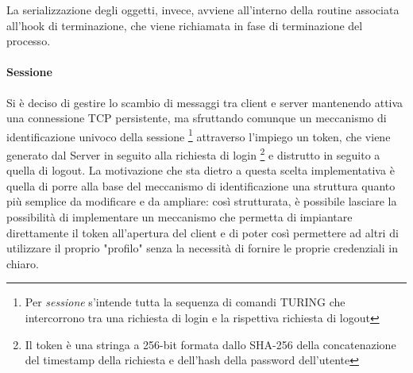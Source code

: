 La serializzazione degli oggetti, invece, avviene all'interno della routine associata all'hook di terminazione, che viene richiamata in fase di terminazione del processo.

\paragraph{Sessione}
Si è deciso di gestire lo scambio di messaggi tra client e server mantenendo attiva una connessione TCP persistente, ma sfruttando comunque un meccanismo di identificazione univoco della sessione \footnote{Per \textit{sessione} s'intende tutta la sequenza di comandi TURING che intercorrono tra una richiesta di login e la rispettiva richiesta di logout} attraverso l'impiego un token, che viene generato dal Server in seguito alla richiesta di login \footnote{Il token è una stringa a 256-bit formata dallo SHA-256 della concatenazione del timestamp della richiesta e dell'hash della password dell'utente} e distrutto in seguito a quella di logout. La motivazione che sta dietro a questa scelta implementativa è quella di porre alla base del meccanismo di identificazione una struttura quanto più semplice da modificare e da ampliare: così strutturata, è possibile lasciare la possibilità di implementare un meccanismo che permetta di impiantare direttamente il token all'apertura del client e di poter così permettere ad altri di utilizzare il proprio "profilo" senza la necessità di fornire le proprie credenziali in chiaro.

